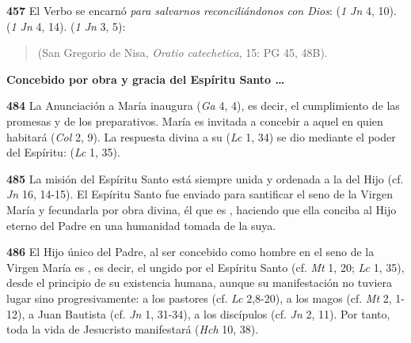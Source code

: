 \begin{body}
\begin{body}
\textbf{457} El Verbo se encarnó \emph{para salvarnos reconciliándonos con Dios}:  (\emph{1 Jn} 4, 10).  (\emph{1 Jn} 4, 14).  (\emph{1 Jn} 3, 5):

\begin{quote}  (San Gregorio de Nisa, \emph{Oratio catechetica}, 15: PG 45, 48B). \end{quote}

\textbf{Concebido por obra y gracia del Espíritu Santo \ldots{}}

\textbf{484} La Anunciación a María inaugura  (\emph{Ga} 4, 4), es decir, el cumplimiento de las promesas y de los preparativos. María es invitada a concebir a aquel en quien habitará  (\emph{Col} 2, 9). La respuesta divina a su  (\emph{Lc} 1, 34) se dio mediante el poder del Espíritu:  (\emph{Lc} 1, 35).

\textbf{485} La misión del Espíritu Santo está siempre unida y ordenada a la del Hijo (cf. \emph{Jn} 16, 14-15). El Espíritu Santo fue enviado para santificar el seno de la Virgen María y fecundarla por obra divina, él que es , haciendo que ella conciba al Hijo eterno del Padre en una humanidad tomada de la suya.

\textbf{486} El Hijo único del Padre, al ser concebido como hombre en el seno de la Virgen María es , es decir, el ungido por el Espíritu Santo (cf. \emph{Mt} 1, 20; \emph{Lc} 1, 35), desde el principio de su existencia humana, aunque su manifestación no tuviera lugar sino progresivamente: a los pastores (cf. \emph{Lc} 2,8-20), a los magos (cf. \emph{Mt} 2, 1-12), a Juan Bautista (cf. \emph{Jn} 1, 31-34), a los discípulos (cf. \emph{Jn} 2, 11). Por tanto, toda la vida de Jesucristo manifestará  (\emph{Hch} 10, 38).


\end{body}
\end{body}

